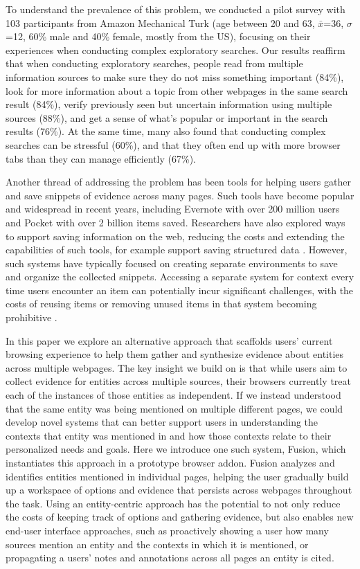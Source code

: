 To understand the prevalence of this problem, we conducted a pilot survey with 103 participants from Amazon Mechanical Turk (age between 20 and 63, $\bar{x}$=36, $\sigma$=12, 60\% male and 40\% female, mostly from the US), focusing on their experiences when conducting complex exploratory searches. Our results reaffirm that when conducting exploratory searches, people read from multiple information sources to make sure they do not miss something important (84\%), look for more information about a topic from other webpages in the same search result (84\%), verify previously seen but uncertain information using multiple sources (88\%), and get a sense of what's popular or important in the search results (76\%). At the same time, many also found that conducting complex searches can be stressful (60\%), and that they often end up with more browser tabs than they can manage efficiently (67\%).

Another thread of addressing the problem has been tools for helping users gather and save snippets of evidence across many pages. Such tools have become popular and widespread in recent years, including Evernote with over 200 million users and Pocket with over 2 billion items saved. Researchers have also explored ways to support saving information on the web, reducing the costs and extending the capabilities of such tools, for example support saving structured data \cite{thresher,bier2006entity}. However, such systems have typically focused on creating separate environments to save and organize the collected snippets.  Accessing a separate system for context every time users encounter an item can potentially incur significant challenges, with the costs of reusing items or removing unused items in that system becoming prohibitive \cite{notetoself}.

In this paper we explore an alternative approach that scaffolds users' current browsing experience to help them gather and synthesize evidence about entities across multiple webpages. The key insight we build on is that while users aim to collect evidence for entities across multiple sources, their browsers currently treat each of the instances of those entities as independent. If we instead understood that the same entity was being mentioned on multiple different pages, we could develop novel systems that can better support users in understanding the contexts that entity was mentioned in and how those contexts relate to their personalized needs and goals. Here we introduce one such system, Fusion, which instantiates this approach in a prototype browser addon. Fusion analyzes and identifies entities mentioned in individual pages, helping the user gradually build up a workspace of options and evidence that persists across webpages throughout the task. Using an entity-centric approach has the potential to not only reduce the costs of keeping track of options and gathering evidence, but also enables new end-user interface approaches, such as proactively showing a user how many sources mention an entity and the contexts in which it is mentioned, or propagating a users' notes and annotations across all pages an entity is cited.

